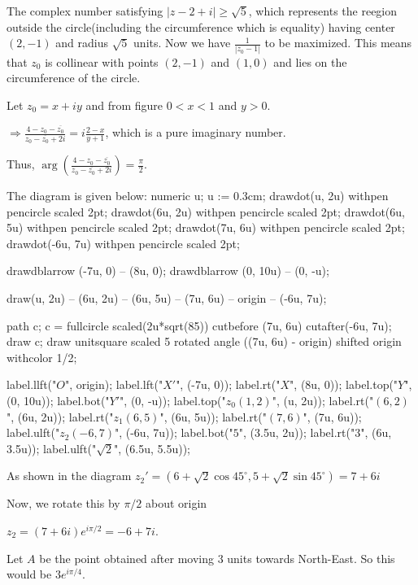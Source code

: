   The complex number satisfying $|z - 2 + i|\geq \sqrt{5}$, which represents the reegion outside the
  circle(including the circumference which is equality) having center $(2, -1)$ and radius $\sqrt{5}$
  units. Now we have $\frac{1}{|z_0 - 1|}$ to be maximized. This means that $z_0$ is collinear with points
  $(2, -1)$ and $(1, 0)$ and lies on the circumference of the circle.

  Let $z_0 = x + iy$ and from figure $0 < x < 1$ and $y > 0$.

  $\Rightarrow \frac{4 - z_0 - \overline{z_0}}{z_0 - \overline{z_0} + 2i} = i\frac{2 - x}{y + 1}$, which is
  a pure imaginary number.

  Thus, $\arg\left(\frac{4 - z_0 - \overline{z_0}}{z_0 - \overline{z_0} + 2i}\right) = \frac{\pi}{2}$.
\item The diagram is given below:
  \startplacefigure[location=force]
    \startMPcode
      numeric u;
      u := 0.3cm;
      drawdot(u, 2u) withpen pencircle scaled 2pt;
      drawdot(6u, 2u) withpen pencircle scaled 2pt;
      drawdot(6u, 5u) withpen pencircle scaled 2pt;
      drawdot(7u, 6u) withpen pencircle scaled 2pt;
      drawdot(-6u, 7u) withpen pencircle scaled 2pt;

      drawdblarrow (-7u, 0) -- (8u, 0);
      drawdblarrow (0, 10u) -- (0, -u);

      draw(u, 2u) -- (6u, 2u) -- (6u, 5u) -- (7u, 6u) -- origin -- (-6u, 7u);

      path c;
      c = fullcircle scaled(2u*sqrt(85)) cutbefore (7u, 6u) cutafter(-6u, 7u);
      draw c;
      draw unitsquare scaled 5 rotated angle ((7u, 6u) - origin) shifted origin withcolor 1/2;

      label.llft("$O$", origin);
      label.lft("$X'$", (-7u, 0));
      label.rt("$X$", (8u, 0));
      label.top("$Y$", (0, 10u));
      label.bot("$Y'$", (0, -u));
      label.top("$z_0(1, 2)$", (u, 2u));
      label.rt("$(6, 2)$", (6u, 2u));
      label.rt("$z_1(6, 5)$", (6u, 5u));
      label.rt("$(7, 6)$", (7u, 6u));
      label.ulft("$z_2(-6, 7)$", (-6u, 7u));
      label.bot("$5$", (3.5u, 2u));
      label.rt("$3$", (6u, 3.5u));
      label.ulft("$\sqrt{2}$", (6.5u, 5.5u));
    \stopMPcode

  \stopplacefigure

  As shown in the diagram $z_2' = \left(6 + \sqrt{2}\cos45^\circ, 5 + \sqrt{2}\sin45^\circ\right) = 7 + 6i$

  Now, we rotate this by $\pi/2$ about origin

  $z_2 = (7 + 6i)e^{i\pi/2} = -6 + 7i$.
\item Let $A$ be the point obtained after moving $3$ units towards North-East. So this would be
  $3e^{i\pi/4}$.

